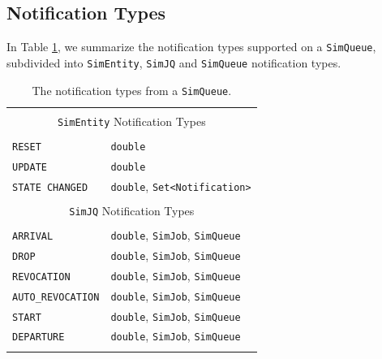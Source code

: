 \documentclass[12pt]{book}
\begin{document}
\subsection{Notification Types}

In Table \ref{tab:guided:notification-types},
  we summarize the notification types supported on a \lstinline|SimQueue|,
  subdivided into \lstinline|SimEntity|, \lstinline|SimJQ|
  and \lstinline|SimQueue| notification types.

\begin{table}[h]
\label{tab:guided:notification-types}
\caption{The notification types from a \texttt{SimQueue}.}
\begin{center}
\begin{tabular}{|l|l|}
\hline
\multicolumn{2}{|c|}{} \\
\multicolumn{2}{|c|}{\lstinline[basicstyle=\ttfamily]{SimEntity} Notification Types} \\
\multicolumn{2}{|c|}{} \\
\hline
\lstinline|RESET|         & \lstinline|double|                                \\ \hline
\lstinline|UPDATE|        & \lstinline|double|                                \\ \hline
\lstinline|STATE CHANGED| & \lstinline|double|, \lstinline|Set<Notification>| \\ \hline
\hline
\multicolumn{2}{|c|}{} \\
\multicolumn{2}{|c|}{\lstinline[basicstyle=\ttfamily]{SimJQ} Notification Types} \\
\multicolumn{2}{|c|}{} \\
\hline
\lstinline|ARRIVAL|            & \lstinline|double|, \lstinline|SimJob|, \lstinline|SimQueue| \\ \hline
\lstinline|DROP|               & \lstinline|double|, \lstinline|SimJob|, \lstinline|SimQueue| \\ \hline
\lstinline|REVOCATION|         & \lstinline|double|, \lstinline|SimJob|, \lstinline|SimQueue| \\ \hline
\lstinline|AUTO_REVOCATION|    & \lstinline|double|, \lstinline|SimJob|, \lstinline|SimQueue| \\ \hline
\lstinline|START|              & \lstinline|double|, \lstinline|SimJob|, \lstinline|SimQueue| \\ \hline
\lstinline|DEPARTURE|          & \lstinline|double|, \lstinline|SimJob|, \lstinline|SimQueue| \\ \hline
\hline
\multicolumn{2}{|c|}{} \\

\end{tabular}
\end{center}
\end{table}
\end{document}
